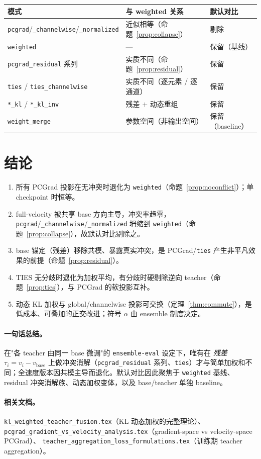 \documentclass[11pt,a4paper]{article}
\newcommand{\vb}{v_{\mathrm{base}}}
\theoremstyle{plain}
\theoremstyle{definition}
\begin{document}
\begin{center}
\begin{tabular}{lll}
\toprule
\textbf{模式} & \textbf{与 weighted 关系} & \textbf{默认对比} \\
\midrule
\texttt{pcgrad}/\texttt{\_channelwise}/\texttt{\_normalized} & 近似相等（命题~\ref{prop:collapse}） & 剔除 \\
\texttt{weighted} & --- & 保留（基线） \\
\texttt{pcgrad\_residual} 系列 & 实质不同（命题~\ref{prop:residual}） & 保留 \\
\texttt{ties} / \texttt{ties\_channelwise} & 实质不同（逐元素 / 逐通道） & 保留 \\
\texttt{*\_kl} / \texttt{*\_kl\_inv} & 残差 $+$ 动态重组 & 保留 \\
\texttt{weight\_merge} & 参数空间（非输出空间） & 保留（baseline） \\
\bottomrule
\end{tabular}
\end{center}

\section{结论}

\begin{enumerate}[leftmargin=1.6em]
\item 所有 PCGrad 投影在无冲突时退化为 \texttt{weighted}（命题~\ref{prop:noconflict}）；单 checkpoint 时恒等。
\item full-velocity 被共享 base 方向主导，冲突率趋零，\texttt{pcgrad}/\texttt{\_channelwise}/\texttt{\_normalized} 坍缩到 \texttt{weighted}（命题~\ref{prop:collapse}），故默认对比剔除之。
\item base 锚定（残差）移除共模、暴露真实冲突，是 PCGrad/\texttt{ties} 产生非平凡效果的前提（命题~\ref{prop:residual}）。
\item TIES 无分歧时退化为加权平均，有分歧时硬剔除逆向 teacher（命题~\ref{prop:ties}），与 PCGrad 的软投影互补。
\item 动态 KL 加权与 global/channelwise 投影可交换（定理~\ref{thm:commute}），是低成本、可叠加的正交改进；符号 $\alpha$ 由 ensemble 制度决定。
\end{enumerate}

\paragraph{一句话总结。} 在"各 teacher 由同一 base 微调"的 \texttt{ensemble-eval} 设定下，唯有在 \emph{残差} $\tau_i=v_i-\vb$ 上做冲突消解（\texttt{pcgrad\_residual} 系列、\texttt{ties}）才与简单加权和不同；全速度版本因共模主导而退化。默认对比因此聚焦于 \texttt{weighted} 基线、residual 冲突消解族、动态加权变体，以及 base/teacher 单独 baseline。

\paragraph{相关文档。}
\texttt{kl\_weighted\_teacher\_fusion.tex}（KL 动态加权的完整理论）、
\texttt{pcgrad\_gradient\_vs\_velocity\_analysis.tex}（gradient-space vs velocity-space PCGrad）、
\texttt{teacher\_aggregation\_loss\_formulations.tex}（训练期 teacher aggregation）。
\end{document}
